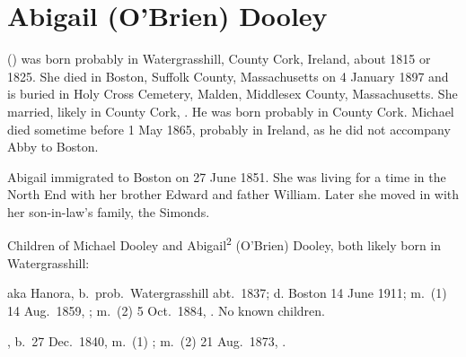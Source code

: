 \section{Abigail (O'Brien) Dooley}\label{per:Abigail2OBrien}

 () was born probably in Watergrasshill, County Cork, Ireland, about 1815\cite{Census1855Abigail} or 1825.\cite{Abigail2OBrienDeath:1} She died in Boston, Suffolk County, Massachusetts on 4 January 1897\cite{Abigail2OBrienDeath:2} and is buried in Holy Cross Cemetery, Malden, Middlesex County, Massachusetts.\cite{CarolGordon:2} She married, likely in County Cork, .\cite{Abigail2OBrienDeath:3} He was born probably in County Cork.\cite{MichaelDooleyBirth} Michael died sometime before 1 May 1865,\cite{Census1865Abigail} probably in Ireland, as he did not accompany Abby to Boston.\cite{Chascay:7}

Abigail immigrated to Boston on 27 June 1851.\cite{Chascay:8} She was living for a time in the North End with her brother Edward and father William.\cite{Census1855William:4} Later she moved in with her son-in-law's family, the Simonds.\cite{Census1860AbigailOBrien}

\begin{KidsIntro}
	Children of Michael Dooley and Abigail\textsuperscript{2} (O'Brien) Dooley, both likely born in Watergrasshill:
\end{KidsIntro}

\begin{Kids}
	 aka Hanora, b.\ prob.\ Watergrasshill abt.\ 1837;\cite{Census1855Hannah3Dooley} d. Boston 14 June 1911;\cite{Hannah3DooleyDeath} m.\ (1) 14 Aug.\ 1859, ;\cite{JeremiahCooneyMarriage} m.\ (2) 5 Oct.\ 1884, .\cite{MichaelCusickMarriage} No known children.
	
	, b.\ 27 Dec.\ 1840, m.\ (1) ; m.\ (2) 21 Aug.\ 1873, .
\end{Kids}
